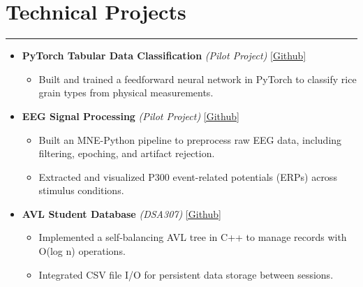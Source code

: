\documentclass[10pt, a4paper]{article}
\newcommand{\link}[2]{\href{#1}{\color{bluecolor}#2}}
\begin{document}
\section*{Technical Projects}\vspace{-2pt}\hrule\vspace{6pt}
\begin{itemize}[label=\raisebox{0.25ex}{\rule{0.7ex}{0.7ex}}]

    \item \textbf{PyTorch Tabular Data Classification} \textit{(Pilot Project)}
    \link{https://github.com/MdSafwanBinRashid/ML_DL_Pilots/blob/main/PyTorch_Tabular_Data_Classification.ipynb}{[Github]}
    \begin{itemize}[label=--, nosep]
        \item Built and trained a feedforward neural network in PyTorch to classify rice grain types from physical measurements.
    \end{itemize}

    \vspace{8pt}
    
    \item \textbf{EEG Signal Processing} \textit{(Pilot Project)}
    \link{https://github.com/MdSafwanBinRashid/Electroencephalography/blob/main/EEG_Signal_Processing.ipynb}{[Github]}
    \begin{itemize}[label=--, nosep]
        \item Built an MNE-Python pipeline to preprocess raw EEG data, including filtering, epoching, and artifact rejection.
        \item Extracted and visualized P300 event-related potentials (ERPs) across stimulus conditions.
    \end{itemize}

    \vspace{8pt}
    
    \item \textbf{AVL Student Database} \textit{(DSA307)} 
    \link{https://github.com/MdSafwanBinRashid/AVLStudentDB}{[Github]}
    \begin{itemize}[label=--, nosep]
        \item Implemented a self-balancing AVL tree in C++ to manage records with O(log n) operations.
        \item Integrated CSV file I/O for persistent data storage between sessions.
    \end{itemize}


\end{itemize}
\end{document}

